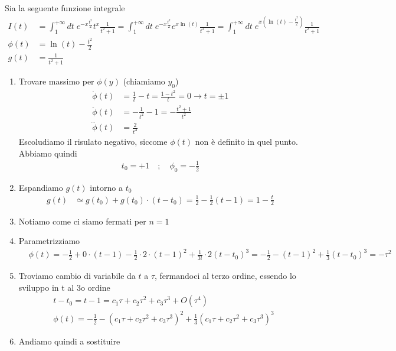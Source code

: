 Sia la seguente funzione integrale
\begin{align}
	I(t)    &= \int_{1}^{+\infty} dt \; e^{-x \frac{t^2}{2}}t^x \frac{1}{t^2 + 1} = \int_{1}^{+\infty} dt \; e^{-x \frac{t^2}{2}} e^{x\ln(t)} \frac{1}{t^2 + 1} = \int_{1}^{+\infty} dt \; e^{x\left(\ln(t) -\frac{t^2}{2}\right)} \frac{1}{t^2 + 1}\\
	\phi(t) &= \ln(t) - \frac{t^2}{2} \\
	g(t)    &= \frac{1}{t^2 + 1}
\end{align}

\begin{enumerate}
	\item Trovare massimo per \(\phi(y)\) (chiamiamo \(y_0\))
	\begin{align}
		\dot{\phi}(t) &=\frac{1}{t} - t = \frac{1- t^2}{t} = 0 \to t = \pm 1\\
		\ddot{\phi}(t) &= -\frac{1}{t^2} - 1 = -\frac{t^2+1}{t^2}  \\
		\dddot{\phi}(t) &= \frac{2}{t^3}
	\end{align}
	Escoludiamo il risulato negativo, siccome $\phi(t)$ non è definito in quel punto. Abbiamo quindi
	\begin{align}
		t_0=+1 \quad ; \quad\phi_0 = -\frac{1}{2}
	\end{align}
	\item Espandiamo \(g(t)\) intorno a \(t_0\)
	\begin{align}
		g(t) &\simeq g(t_0) + g(t_0)\cdot(t-t_0) = \frac{1}{2} - \frac{1}{2} (t-1) = 1-\frac{t}{2} 
	\end{align}
	\item Notiamo come ci siamo fermati per \(n=1\)
	\item Parametrizziamo
	\begin{align}
		&\phi(t)= -\frac{1}{2} + 0\cdot(t-1) - \frac{1}{2}\cdot 2 \cdot(t-1)^2  + \frac{1}{3!} \cdot 2 (t-t_0)^3= -\frac{1}{2} - (t-1)^2 + \frac{1}{3} (t-t_0)^3= -\tau^2
	\end{align}
	\item Troviamo cambio di variabile da \(t\) a \(\tau\), fermandoci al terzo ordine, essendo lo sviluppo in t al 3o ordine
	\begin{align}
		&t-t_0 = t-1 = c_1 \tau + c_2 \tau^2 + c_3 \tau^3 + O(\tau^4)\\
		&\phi(t) = - \frac{1}{2} - (c_1 \tau + c_2 \tau^2 + c_3 \tau^3)^2+ \frac{1}{3} (c_1 \tau + c_2 \tau^2 + c_3 \tau^3)^3
	\end{align}
	\item Andiamo quindi a sostituire

\end{enumerate}
